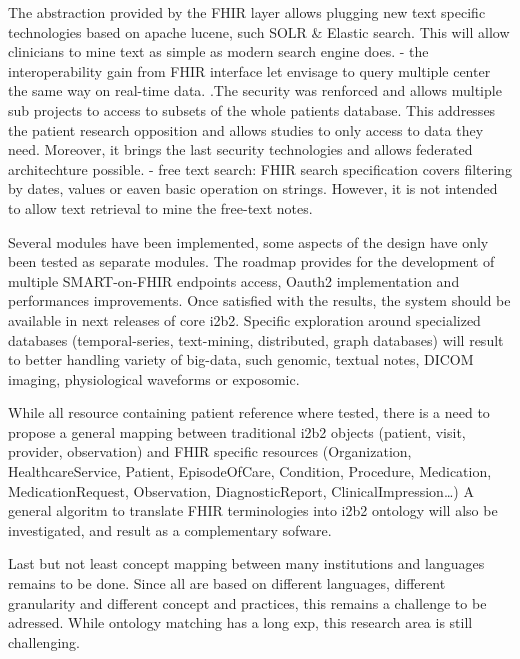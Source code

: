 \documentclass{amia}
\begin{document}
The abstraction provided by the FHIR layer allows plugging new text specific technologies based on apache lucene, such SOLR \& Elastic search. This will allow clinicians to mine text as simple as modern search engine does. - the interoperability gain from FHIR interface let envisage to query multiple center the same way on real-time data.
.The security was renforced and allows multiple sub projects to access to subsets of the whole patients database. This addresses the patient research opposition and allows studies to only access to data they need. Moreover, it brings the last security technologies and allows federated architechture possible. - free text search: FHIR search specification covers filtering by dates, values or eaven basic operation on strings. However, it is not intended to allow text retrieval to mine the free-text notes. 

Several modules have been implemented, some aspects of the design have only been tested as separate modules.
The roadmap provides for the development of multiple SMART-on-FHIR endpoints access, Oauth2 implementation and performances improvements. Once satisfied with the results, the system should be available in next releases of core i2b2. Specific exploration around specialized databases (temporal-series, text-mining, distributed, graph databases) will result to better handling variety of big-data, such genomic\cite{ref18}, textual notes, DICOM imaging, physiological waveforms or exposomic.

While all resource containing patient reference where tested, there is a need to propose a general mapping between traditional i2b2 objects (patient, visit, provider, observation) and FHIR specific resources (Organization, HealthcareService, Patient, EpisodeOfCare, Condition, Procedure, Medication, MedicationRequest, Observation, DiagnosticReport, ClinicalImpression\ldots)
A general algoritm to translate FHIR terminologies into i2b2 ontology will also be investigated, and result as a complementary sofware.

Last but not least concept mapping between many institutions and languages remains to be done. Since all are based on different languages, different granularity and different concept and practices, this remains a challenge to be adressed. While ontology matching has a long exp, this research area is still challenging.
\end{document}
